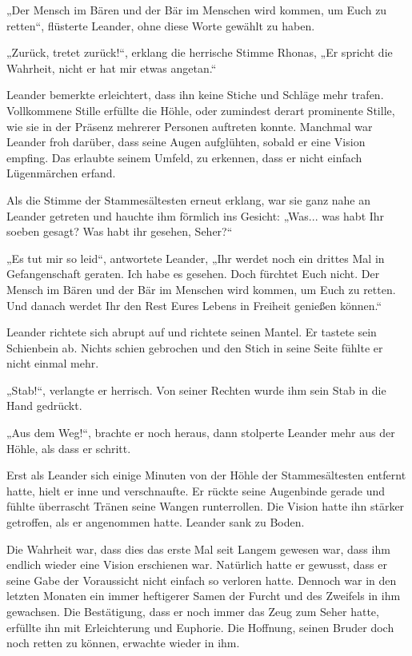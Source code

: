 „Der Mensch im Bären und der Bär im Menschen wird kommen, um Euch zu retten“, flüsterte Leander, ohne diese Worte gewählt zu haben.

„Zurück, tretet zurück!“, erklang die herrische Stimme Rhonas, „Er spricht die Wahrheit, nicht er hat mir etwas angetan.“

Leander bemerkte erleichtert, dass ihn keine Stiche und Schläge mehr trafen. Vollkommene Stille erfüllte die Höhle, oder zumindest derart prominente Stille, wie sie in der Präsenz mehrerer Personen auftreten konnte. Manchmal war Leander froh darüber, dass seine Augen aufglühten, sobald er eine Vision empfing. Das erlaubte seinem Umfeld, zu erkennen, dass er nicht einfach Lügenmärchen erfand.

Als die Stimme der Stammesältesten erneut erklang, war sie ganz nahe an Leander getreten und hauchte ihm förmlich ins Gesicht: „Was... was habt Ihr soeben gesagt? Was habt ihr gesehen, Seher?“

„Es tut mir so leid“, antwortete Leander, „Ihr werdet noch ein drittes Mal in Gefangenschaft geraten. Ich habe es gesehen. Doch fürchtet Euch nicht. Der Mensch im Bären und der Bär im Menschen wird kommen, um Euch zu retten. Und danach werdet Ihr den Rest Eures Lebens in Freiheit genießen können.“

Leander richtete sich abrupt auf und richtete seinen Mantel. Er tastete sein Schienbein ab. Nichts schien gebrochen und den Stich in seine Seite fühlte er nicht einmal mehr.

„Stab!“, verlangte er herrisch. Von seiner Rechten wurde ihm sein Stab in die Hand gedrückt.

„Aus dem Weg!“, brachte er noch heraus, dann stolperte Leander mehr aus der Höhle, als dass er schritt.



\trennzeichen



Erst als Leander sich einige Minuten von der Höhle der Stammesältesten entfernt hatte, hielt er inne und verschnaufte. Er rückte seine Augenbinde gerade und fühlte überrascht Tränen seine Wangen runterrollen. Die Vision hatte ihn stärker getroffen, als er angenommen hatte. Leander sank zu Boden.

Die Wahrheit war, dass dies das erste Mal seit Langem gewesen war, dass ihm endlich wieder eine Vision erschienen war. Natürlich hatte er gewusst, dass er seine Gabe der Voraussicht nicht einfach so verloren hatte. Dennoch war in den letzten Monaten ein immer heftigerer Samen der Furcht und des Zweifels in ihm gewachsen. Die Bestätigung, dass er noch immer das Zeug zum Seher hatte, erfüllte ihn mit Erleichterung und Euphorie. Die Hoffnung, seinen Bruder doch noch retten zu können, erwachte wieder in ihm.

